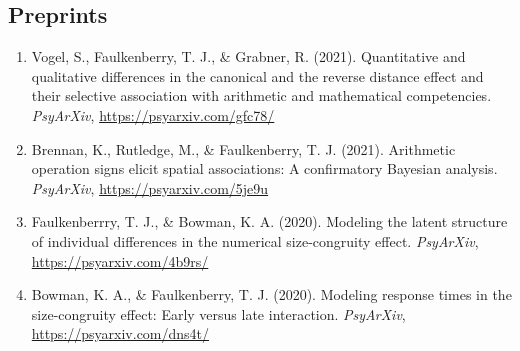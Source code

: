 \documentclass[article,10pt]{article}
\begin{document}
\subsection*{Preprints}
\label{sec:orgc78ff3c}
\begin{enumerate}
\item Vogel, S., Faulkenberry, T. J., \& Grabner, R. (2021). Quantitative and qualitative differences in the canonical and the reverse distance effect and their selective association with arithmetic and mathematical competencies. \emph{PsyArXiv}, \url{https://psyarxiv.com/gfc78/}
\item Brennan, K., Rutledge, M., \& Faulkenberry, T. J. (2021). Arithmetic operation signs elicit spatial associations: A confirmatory Bayesian analysis. \emph{PsyArXiv}, \url{https://psyarxiv.com/5je9u}
\item Faulkenberrry, T. J., \& Bowman, K. A. (2020). Modeling the latent structure of individual differences in the numerical size-congruity effect. \emph{PsyArXiv}, \url{https://psyarxiv.com/4b9rs/}
\item Bowman, K. A., \& Faulkenberry, T. J. (2020). Modeling response times in the size-congruity effect: Early versus late interaction. \emph{PsyArXiv}, \url{https://psyarxiv.com/dns4t/}
\end{enumerate}
\end{document}
